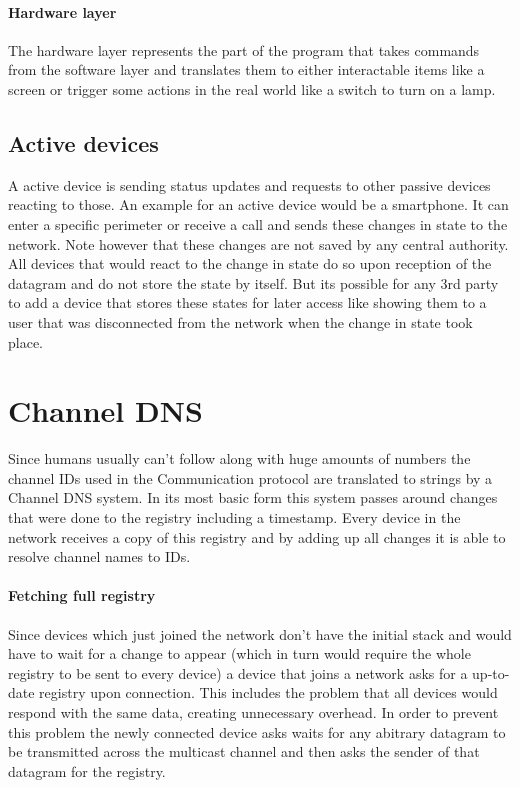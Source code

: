 \documentclass[a4paper]{article}
\begin{document}
            \paragraph{Hardware layer} The hardware layer represents the part of the program that takes commands from the
                software layer and translates them to either interactable items like a screen or trigger some actions in
                the real world like a switch to turn on a lamp.
        \subsection{Active devices}
            A active device is sending status updates and requests to other passive devices reacting to those. An
            example for an active device would be a smartphone. It can enter a specific perimeter or receive a call and
            sends these changes in state to the network. Note however that these changes are not saved by any
            central authority. All devices that would react to the change in state do so upon reception of the datagram
            and do not store the state by itself. But its possible for any 3rd party to add a device that stores these
            states for later access like showing them to a user that was disconnected from the network when the change
            in state took place.
	\section{Channel DNS}
	    Since humans usually can't follow along with huge amounts of numbers the channel IDs used in the Communication
	    protocol are translated to strings by a Channel DNS system. In its most basic form this system passes around
	    changes that were done to the registry including a timestamp. Every device in the network receives a
	    copy of this registry and by adding up all changes it is able to resolve channel names to IDs.
	    \paragraph{Fetching full registry} Since devices which just joined the network don't have the initial stack and
	        would have to wait for a change to appear (which in turn would require the whole registry to be sent to
	        every device) a device that joins a network asks for a up-to-date registry upon connection. This
	        includes the problem that all devices would respond with the same data, creating unnecessary overhead. In
	        order to prevent this problem the newly connected device asks waits for any abitrary datagram to be
	        transmitted across the multicast channel and then asks the sender of that datagram for the registry.
\end{document}
